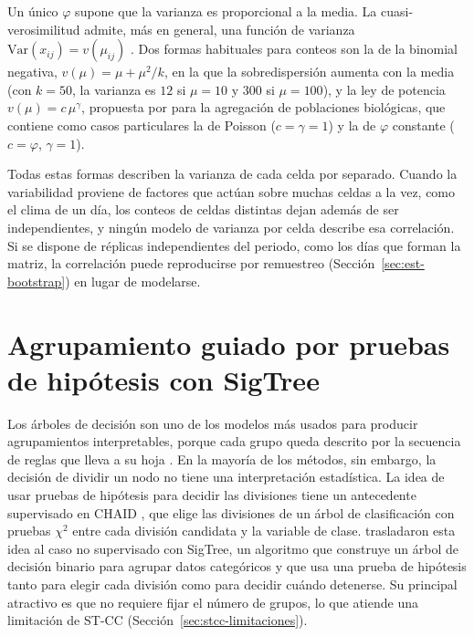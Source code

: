 Un único $\varphi$ supone que la varianza es proporcional a la media. La
cuasi-verosimilitud admite, más en general, una función de varianza
$\mathrm{Var}(x_{ij}) = v(\mu_{ij})$ \citep{McCullagh1989}. Dos formas habituales
para conteos son la de la binomial negativa, $v(\mu) = \mu + \mu^2/k$, en la que
la sobredispersión aumenta con la media (con $k = 50$, la varianza es $12$ si $\mu = 10$ y $300$ si $\mu = 100$), y la ley de potencia
$v(\mu) = c\,\mu^\gamma$, propuesta por \citet{Taylor1961} para la agregación de
poblaciones biológicas, que contiene como casos particulares la de Poisson
($c=\gamma=1$) y la de $\varphi$ constante ($c=\varphi$, $\gamma=1$).

Todas estas formas describen la varianza de cada celda por separado. Cuando la
variabilidad proviene de factores que actúan sobre muchas celdas a la vez, como
el clima de un día, los conteos de celdas distintas dejan además de ser
independientes, y ningún modelo de varianza por celda describe esa correlación.
Si se dispone de réplicas independientes del periodo, como los días que forman
la matriz, la correlación puede reproducirse por remuestreo
(Sección~\ref{sec:est-bootstrap}) en lugar de modelarse.

\section{Agrupamiento guiado por pruebas de hipótesis con SigTree}\label{sec:sigtree}

Los árboles de decisión son uno de los modelos más usados para producir
agrupamientos interpretables, porque cada grupo queda descrito por la secuencia de
reglas que lleva a su hoja \citep{Hu2025}. En la mayoría de los métodos, sin
embargo, la decisión de dividir un nodo no tiene una interpretación estadística.
La idea de usar pruebas de hipótesis para decidir las divisiones tiene un
antecedente supervisado en CHAID \citep{Kass1980}, que elige las divisiones de un
árbol de clasificación con pruebas $\chi^2$ entre cada división candidata y la
variable de clase. \citet{Hu2025} trasladaron esta idea al caso no supervisado con
SigTree, un algoritmo que construye un árbol de decisión binario para agrupar
datos categóricos y que usa una prueba de hipótesis tanto para elegir cada
división como para decidir cuándo detenerse. Su principal atractivo es que no requiere fijar el número de grupos, lo que atiende una limitación de ST-CC (Sección~\ref{sec:stcc-limitaciones}).

